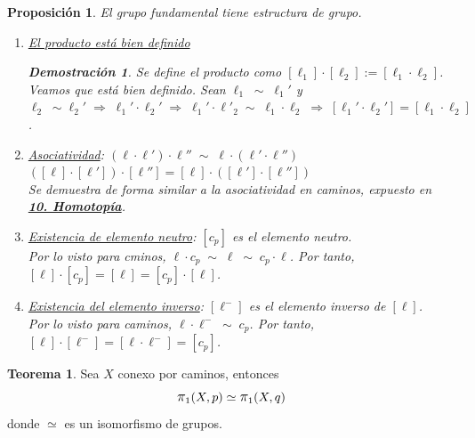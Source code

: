 \documentclass[12pt,twoside]{report}
\theoremstyle{azul}
\theoremstyle{azul2}
\theoremstyle{plain}
\newtheorem*{prop}{Proposición}
\theoremstyle{definition}
\newtheorem*{dem}{Demostración}
\newtheorem*{teo}{Teorema}
\theoremstyle{remark}
\begin{document}
\begin{prop}
El grupo fundamental tiene estructura de grupo.
\begin{enumerate}
    \item \underline{El producto está bien definido}
    \begin{dem}
    Se define el producto como $[\ell_1] \cdot [\ell_2] := [\ell_1 \cdot \ell_2]$. Veamos que está bien definido. Sean $\ell_1 \; \sim \; \ell_1'$ y $\ell_2 \; \sim \ell_2' \; \Rightarrow \; \ell_1' \cdot \ell_2' \; \Rightarrow \; \ell_1' \cdot \ell'_2 \; \sim \; \ell_1 \cdot \ell_2 \; \Rightarrow \; [\ell_1' \cdot \ell_2']=[\ell_1 \cdot \ell_2]$. 
    \end{dem}
    \item \underline{Asociatividad}: $(\ell \cdot \ell') \cdot \ell'' \; \sim \; \ell \cdot (\ell' \cdot \ell'')$\\ 
    $([\ell] \cdot [\ell']) \cdot [\ell''] = [\ell] \cdot ([\ell'] \cdot [\ell''])$\\
    Se demuestra de forma similar a la asociatividad en caminos, expuesto en \\ \textbf{\textcolor{blue}{\hyperref[sec:9]{10. Homotopía}}}.
    \item \underline{Existencia de elemento neutro}: $[c_p]$ es el elemento neutro.\\ 
    Por lo visto para cminos, $\ell \cdot c_p \; \sim \; \ell \; \sim \; c_p \cdot \ell$. Por tanto,    $[\ell] \cdot [c_p]=[\ell]=[c_p] \cdot [\ell]$. 
    \item \underline{Existencia del elemento inverso}: $[\ell^-]$ es el elemento inverso de $[\ell]$. \\
    Por lo visto para caminos, $\ell \cdot \ell^{-} \; \sim \; c_p$. Por tanto, $[\ell] \cdot [\ell^-] = [\ell \cdot \ell^-]=[c_p]$. 
\end{enumerate}
\end{prop}
\begin{tcolorbox}
\begin{teo} 
Sea $X$ conexo por caminos, entonces
$$\mathlarger{\pi}_1(X,p) \simeq \mathlarger{\pi}_1(X,q)$$
donde $\simeq$ es un isomorfismo de grupos.
\end{teo}
\end{tcolorbox}
\end{document}
